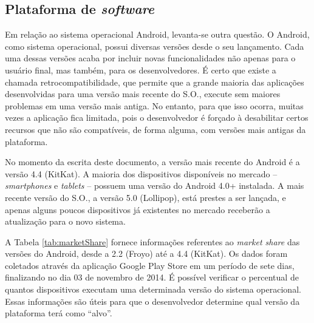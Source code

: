 \subsection{Plataforma de \textit{software}}

Em relação ao sistema operacional Android, levanta-se outra questão. O Android, como sistema operacional, possui diversas versões desde o seu lançamento. Cada uma dessas versões acaba por incluir novas funcionalidades não apenas para o usuário final, mas também, para os desenvolvedores. É certo que existe a chamada retrocompatibilidade, que permite que a grande maioria das aplicações desenvolvidas para uma versão mais recente do S.O., execute sem maiores problemas em uma versão mais antiga. No entanto, para que isso ocorra, muitas vezes a aplicação fica limitada, pois o desenvolvedor é forçado à desabilitar certos recursos que não são compatíveis, de forma alguma, com versões mais antigas da plataforma.

No momento da escrita deste documento, a versão mais recente do Android é a versão 4.4 (KitKat). A maioria dos dispositivos disponíveis no mercado -- \emph{smartphones} e \emph{tablets} -- possuem uma versão do Android 4.0+ instalada. A mais recente versão do S.O., a versão 5.0 (Lollipop), está prestes a ser lançada, e apenas alguns poucos dispositivos já existentes no mercado receberão a atualização para o novo sistema.

A Tabela \ref{tab:marketShare} fornece informações referentes ao \emph{market share} das versões do Android, desde a 2.2 (Froyo) até a 4.4 (KitKat). Os dados foram coletados através da aplicação Google Play Store em um período de sete dias, finalizando no dia 03 de novembro de 2014. É possível verificar o percentual de quantos dispositivos executam uma determinada versão do sistema operacional. Essas informações são úteis para que o desenvolvedor determine qual versão da plataforma terá como ``alvo''.

